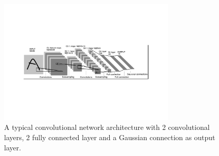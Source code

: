 \begin{figure}
\centering
\includegraphics[trim=4cm 5cm 4cm 5cm, clip=true, height=60mm]{Chapter1/typical_architecture.pdf}
\caption{A typical convolutional network architecture with 2 convolutional layers, 2 fully connected layer and a Gaussian connection as output layer.}
\end{figure}






